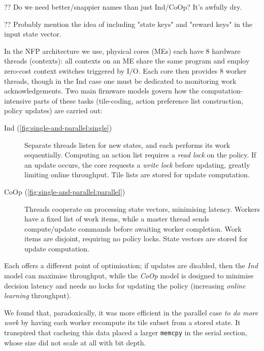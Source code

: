 \documentclass[sigconf,natbib=false]{acmart}
\newcommand{\Coopfw}{CoOp}
\newcommand{\coopfw}{\Coopfw}
\newcommand{\Indfw}{Ind}
\newcommand{\indfw}{\Indfw}
\begin{document}
?? Do we need better/snappier names than just \Indfw/\Coopfw? It's awfully dry.

?? Probably mention the idea of including "state keys" and "reward keys" in the input state vector.

In the NFP architecture we use, physical cores (MEs) each have 8 hardware threads (contexts): all contexts on an ME share the same program and employ zero-cost context switches triggered by I/O.
Each core then provides 8 worker threads, though in the \indfw{} case one must be dedicated to monitoring work acknowledgements.
Two main firmware models govern how the computation-intensive parts of these tasks (tile-coding, action preference list construction, policy updates) are carried out:
\begin{description}
	\item[\Indfw{} (\cref{fig:single-and-parallel:single})] Separate threads listen for new states, and each performs its work sequentially. Computing an action list requires a \emph{read lock} on the policy. If an update occurs, the core requests a \emph{write lock} before updating, greatly limiting online throughput. Tile lists are stored for update computation.
	\item[\Coopfw{} (\cref{fig:single-and-parallel:parallel})] Threads cooperate on processing state vectors, minimising latency. Workers have a fixed list of work items, while a master thread sends compute/update commands before awaiting worker completion. Work items are disjoint, requiring no policy locks. State vectors are stored for update computation.
\end{description}
Each offers a different point of optimisation; if updates are disabled, then the \emph{\indfw{}} model can maximise throughput, while the \emph{\coopfw{}} model is designed to minimise decision latency and needs no locks for updating the policy (increasing \emph{online learning} throughput).

We found that, paradoxically, it was more efficient in the parallel case \emph{to do more work} by having each worker recompute its tile subset from a stored state.
It transpired that cacheing this data placed a larger \texttt{memcpy} in the serial section, whose size did not scale at all with bit depth.
\end{document}
